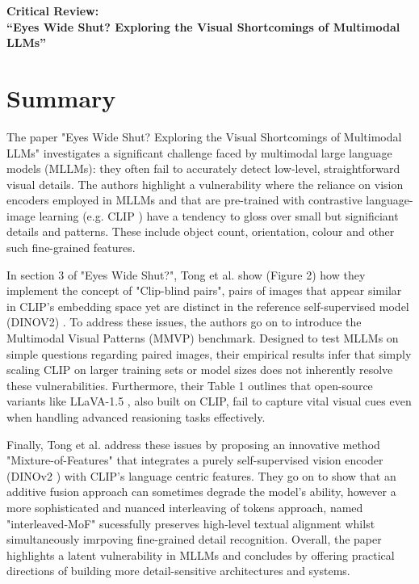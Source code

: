 \documentclass[11pt]{article}
\begin{document}
\thispagestyle{fancy}

\begin{center}
    {\large \textbf{Critical Review:}\\
    \textbf{``Eyes Wide Shut? Exploring the Visual Shortcomings of Multimodal LLMs''}}
\end{center}

\section*{Summary}

The paper "Eyes Wide Shut? Exploring the Visual Shortcomings of Multimodal LLMs" \cite{Tong2024CVPR} investigates a significant challenge faced by multimodal large language models (MLLMs): they often fail to accurately detect low-level, straightforward visual details.
The authors highlight a vulnerability where the reliance on vision encoders employed in MLLMs and that are pre-trained with contrastive language-image learning (e.g. CLIP \cite{Radford2021ICML}) have a tendency to gloss over small but significiant details and patterns. These include object count, orientation, colour and other such fine-grained features.

In section 3 of "Eyes Wide Shut?", Tong et al. show (Figure 2) how they implement the concept of "Clip-blind pairs", pairs of images that appear similar in CLIP's embedding space yet are distinct in the reference self-supervised model (DINOV2) \cite{Oquab2023DINOv2}.
To address these issues, the authors go on to introduce the Multimodal Visual Patterns (MMVP) benchmark. Designed to test MLLMs on simple questions regarding paired images, their empirical results infer that simply scaling CLIP on larger training sets or model sizes does not inherently resolve these vulnerabilities.
Furthermore, their Table 1 outlines that open-source variants like LLaVA-1.5 \cite{Liu2023Arxiv_LLaVA15}, also built on CLIP, fail to capture vital visual cues even when handling advanced reasioning tasks effectively.

Finally, Tong et al. address these issues by proposing an innovative method "Mixture-of-Features" that integrates a purely self-supervised vision encoder (DINOv2 \cite{Oquab2023DINOv2}) with CLIP's language centric features. They go on to show that an additive fusion approach can sometimes degrade the model's ability, however a more sophisticated and nuanced
interleaving of tokens approach, named "interleaved-MoF" sucessfully preserves high-level textual alignment whilst simultaneously imrpoving fine-grained detail recognition. Overall, the paper highlights a latent vulnerability in MLLMs and concludes by offering practical directions of building more detail-sensitive architectures and systems.
\end{document}
